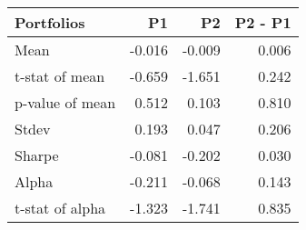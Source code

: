 \begin{tabular}{lrrr}
\toprule
Portfolios & P1 & P2 & P2 - P1 \\
\midrule
Mean & -0.016 & -0.009 & 0.006 \\
t-stat of mean & -0.659 & -1.651 & 0.242 \\
p-value of mean & 0.512 & 0.103 & 0.810 \\
Stdev & 0.193 & 0.047 & 0.206 \\
Sharpe & -0.081 & -0.202 & 0.030 \\
Alpha & -0.211 & -0.068 & 0.143 \\
t-stat of alpha & -1.323 & -1.741 & 0.835 \\
\bottomrule
\end{tabular}
